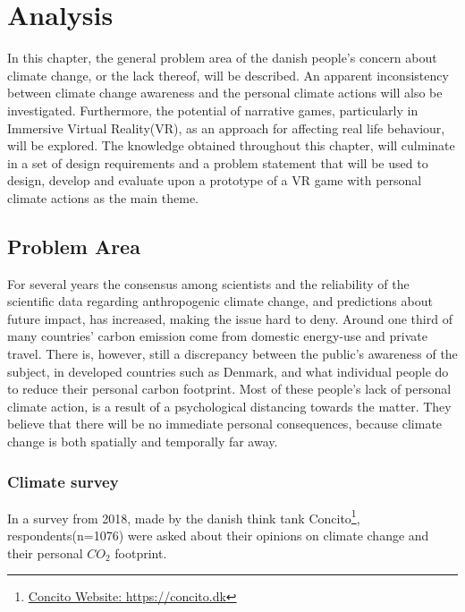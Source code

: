 \chapter{Analysis}\label{chap:analysis}
    In this chapter, the general problem area of the danish people's concern about climate change, or the lack thereof, will be described. An apparent inconsistency between climate change awareness and the personal climate actions will also be investigated. Furthermore, the potential of narrative games, particularly in  Immersive Virtual Reality(VR), as an approach for affecting real life behaviour, will be explored. The knowledge obtained throughout this chapter, will culminate in a set of design requirements and a problem statement that will be used to design, develop and evaluate upon a prototype of a VR game with personal climate actions as the main theme.

\section{Problem Area}\label{sec:problemArea}
    For several years the consensus among scientists and the reliability of the scientific data regarding anthropogenic climate change, and predictions about future impact, has increased, making the issue hard to deny\cite{the5Ds, scientistConsensus, publicEngagementUnderstanding}. Around one third of many countries' carbon emission come from domestic energy-use and private travel\cite{reorientingClimageChangeCommunication}. There is, however, still a discrepancy between the public's awareness of the subject, in developed countries such as Denmark, and what individual people do to reduce their personal carbon footprint. Most of these people's lack of personal climate action, is a result of a psychological distancing towards the matter\cite{the5Ds, publicEngagementUnderstanding}. They believe that there will be no immediate personal consequences, because climate change is both spatially and temporally far away\cite{publicEngagementUnderstanding}.
    
    \subsection{Climate survey}
        In a survey from 2018, made by the danish think tank Concito\footnote{\href{https://concito.dk}{Concito Website: https://concito.dk}}, respondents(n=1076) were asked about their opinions on climate change and their personal ${CO_2}$ footprint.
        

